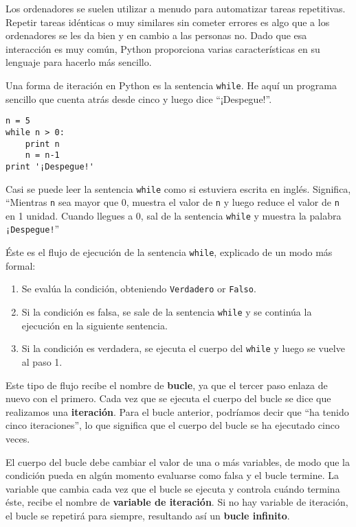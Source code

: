 Los ordenadores se suelen utilizar a menudo para automatizar tareas repetitivas. Repetir
tareas idénticas o muy similares sin cometer errores es algo que a los
ordenadores se les da bien y en cambio a las personas no.
Dado que esa interacción es muy común, Python proporciona varias
características en su lenguaje para hacerlo más sencillo.

Una forma de iteración en Python es la sentencia {\tt while}. He aquí un
programa sencillo que cuenta atrás desde cinco y luego dice ``¡Despegue!''.

\beforeverb
\begin{verbatim}
n = 5
while n > 0:
    print n
    n = n-1
print '¡Despegue!'
\end{verbatim}
\afterverb
%
Casi se puede leer la sentencia {\tt while} como si estuviera escrita en inglés.
Significa, ``Mientras {\tt n} sea mayor que 0,
muestra el valor de {\tt n} y luego reduce el valor de {\tt n}
en 1 unidad. Cuando llegues a 0, sal de la sentencia {\tt while} y
muestra la palabra {\tt ¡Despegue!}''


Éste es el flujo de ejecución de la sentencia {\tt while}, explicado de un modo más formal:

\begin{enumerate}

\item Se evalúa la condición, obteniendo {\tt Verdadero} or {\tt Falso}.

\item Si la condición es falsa, se sale de la sentencia {\tt while}
y se continúa la ejecución en la siguiente sentencia.

\item Si la condición es verdadera, se ejecuta el
cuerpo del {\tt while} y luego se vuelve al paso 1.

\end{enumerate}

Este tipo de flujo recibe el nombre de {\bf bucle}, ya que el tercer paso
enlaza de nuevo con el primero. Cada vez que se ejecuta el cuerpo del
bucle se dice que realizamos una {\bf iteración}. Para el bucle anterior,
podríamos decir que ``ha tenido cinco iteraciones'', lo que significa que el cuerpo
del bucle se ha ejecutado cinco veces.


El cuerpo del bucle debe cambiar el valor de una o más variables,
de modo que la condición pueda en algún momento evaluarse como falsa
y el bucle termine.
La variable que cambia cada vez que el bucle se ejecuta
y controla cuándo termina éste, recibe el nombre de
{\bf variable de iteración}.
Si no hay variable de iteración, el bucle se repetirá para siempre,
resultando así un {\bf bucle infinito}.

